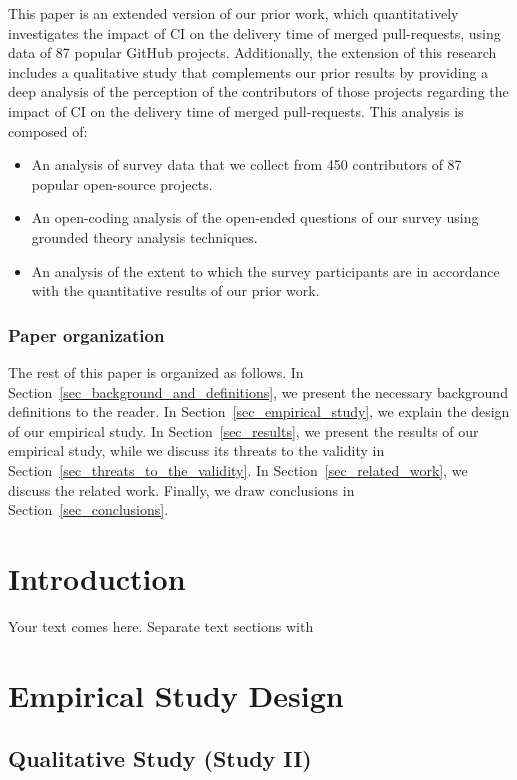 	This paper is an extended version of our prior work, which quantitatively investigates the impact of CI on the delivery time of merged pull-requests, using data of 87 popular GitHub projects. Additionally, the extension of this research includes a qualitative study that complements our prior results by providing a deep analysis of the perception of the contributors of those projects regarding the impact of CI on the delivery time of merged pull-requests. This analysis is composed of:
	
	\begin{itemize}
		\item An analysis of survey data that we collect from 450 contributors of 87 popular open-source projects.
		\item An open-coding analysis of the open-ended questions of our survey using grounded theory analysis techniques.
		\item An analysis of the extent to which the survey participants are in accordance with the quantitative results of our prior work.
	\end{itemize}
	
	\subsubsection*{\textbf{Paper organization}} The rest of this paper is
	organized as follows. In Section~\ref{sec_background_and_definitions}, we
	present the necessary background definitions to the reader. In
	Section~\ref{sec_empirical_study}, we explain the design of our empirical
	study. In Section~\ref{sec_results}, we present the results of our empirical
	study, while we discuss its threats to the validity in
	Section~\ref{sec_threats_to_the_validity}. In Section~\ref{sec_related_work},
	we discuss the related work. Finally, we draw conclusions in
	Section~\ref{sec_conclusions}. 
	
	\section{Introduction}
	\label{sec:intro}
	Your text comes here. Separate text sections with
	\section{Empirical Study Design}
	\label{sec:empirical_study_design}
	
	\subsection{Qualitative Study (Study II)}
	\label{sec:qualitative_study}
	
